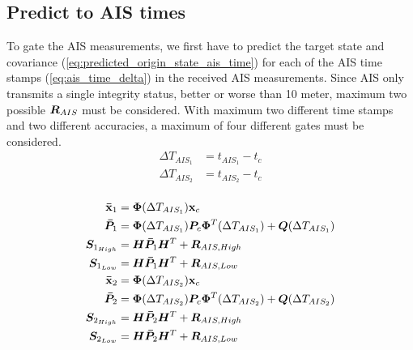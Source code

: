 \subsection{Predict to AIS times}
To gate the AIS measurements, we first have to predict the target state and covariance (\ref{eq:predicted_origin_state_ais_time}) for each of the AIS time stamps (\ref{eq:ais_time_delta}) in the received AIS measurements. Since AIS only transmits a single integrity status, better or worse than 10 meter, maximum two possible \(\bm{R}_{AIS}\) must be considered. With maximum two different time stamps and two different accuracies, a maximum of four different gates must be considered.
\begin{equation}\label{eq:ais_time_delta}
\begin{split}
\Delta T_{AIS_1} &= t_{AIS_1} - t_{c} \\
\Delta T_{AIS_2} &= t_{AIS_2} - t_{c} \\
\end{split}
\end{equation}

\begin{equation}\label{eq:predicted_origin_state_ais_time}
\begin{split}
\boldsymbol{\mathbf{\bar{x}}}_1 	&= \bm{\Phi}(\Delta T_{AIS_1}) \boldsymbol{\mathbf{x}}_c \\
\bm{\bar{P}}_1	&= \bm{\Phi}(\Delta T_{AIS_1}) \bm{P}_c \bm{\Phi}^T(\Delta T_{AIS_1}) + \bm{Q}(\Delta T_{AIS_1}) \\
\bm{S}_{1_{High}}&= \bm{H} \bm{\bar{P}}_1 \bm{H}^T + \bm{R}_{AIS, High} \\
\bm{S}_{1_{Low}}	&= \bm{H} \bm{\bar{P}}_1 \bm{H}^T + \bm{R}_{AIS, Low} \\
\boldsymbol{\mathbf{\bar{x}}}_2 	&= \bm{\Phi}(\Delta T_{AIS_2}) \boldsymbol{\mathbf{x}}_c \\
\bm{\bar{P}}_2	&= \bm{\Phi}(\Delta T_{AIS_2}) \bm{P}_c \bm{\Phi}^T(\Delta T_{AIS_2}) + \bm{Q}(\Delta T_{AIS_2}) \\
\bm{S}_{2_{High}}&= \bm{H} \bm{\bar{P}}_2 \bm{H}^T + \bm{R}_{AIS, High} \\
\bm{S}_{2_{Low}}	&= \bm{H} \bm{\bar{P}}_2 \bm{H}^T + \bm{R}_{AIS, Low} \\
\end{split}
\end{equation}

